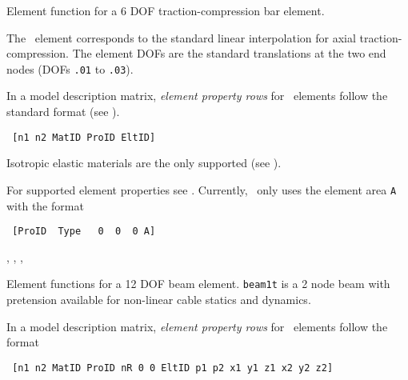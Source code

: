 \renewcommand \thesection {}


\noindent Element function for a 6 DOF traction-compression bar element.%



\noindent    The \bare\   element corresponds to the standard linear interpolation for axial traction-compression. The element DOFs are the standard translations at the two end nodes (DOFs {\tt .01} to {\tt .03}).


In a model description matrix, {\sl 
element property rows} for \bare\ elements follow the standard format 
(see ).

\begin{verbatim}
 [n1 n2 MatID ProID EltID]
\end{verbatim}


Isotropic elastic materials are the only supported (see \melastic).

For supported element properties see \pbeam. Currently, \bare\ only uses the element area {\tt A} with the format

\begin{verbatim}
 [ProID  Type   0  0  0 A] 
\end{verbatim}



\noindent \melastic, \pbeam, \femk, \feplot\  


\noindent Element functions for a 12 DOF beam element. {\tt beam1t} is a 2 node beam with pretension available for non-linear cable statics and dynamics.




In a model description matrix, {\sl element property rows} for \beam\ 
  elements follow the format

\begin{verbatim}
 [n1 n2 MatID ProID nR 0 0 EltID p1 p2 x1 y1 z1 x2 y2 z2]
\end{verbatim}


